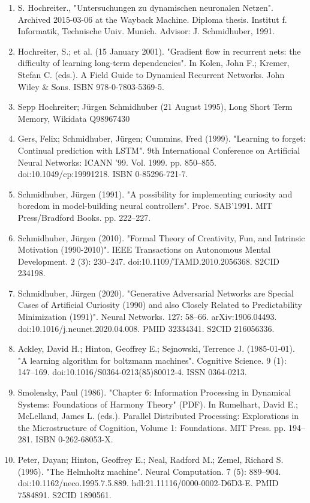 \begin{enumerate}
\item S. Hochreiter., "Untersuchungen zu dynamischen neuronalen Netzen". Archived 2015-03-06 at the Wayback Machine. Diploma thesis. Institut f. Informatik, Technische Univ. Munich. Advisor: J. Schmidhuber, 1991.
\item Hochreiter, S.; et al. (15 January 2001). "Gradient flow in recurrent nets: the difficulty of learning long-term dependencies". In Kolen, John F.; Kremer, Stefan C. (eds.). A Field Guide to Dynamical Recurrent Networks. John Wiley & Sons. ISBN 978-0-7803-5369-5.
\item Sepp Hochreiter; Jürgen Schmidhuber (21 August 1995), Long Short Term Memory, Wikidata Q98967430
\item Gers, Felix; Schmidhuber, Jürgen; Cummins, Fred (1999). "Learning to forget: Continual prediction with LSTM". 9th International Conference on Artificial Neural Networks: ICANN '99. Vol. 1999. pp. 850–855. doi:10.1049/cp:19991218. ISBN 0-85296-721-7.
\item Schmidhuber, Jürgen (1991). "A possibility for implementing curiosity and boredom in model-building neural controllers". Proc. SAB'1991. MIT Press/Bradford Books. pp. 222–227.
\item Schmidhuber, Jürgen (2010). "Formal Theory of Creativity, Fun, and Intrinsic Motivation (1990-2010)". IEEE Transactions on Autonomous Mental Development. 2 (3): 230–247. doi:10.1109/TAMD.2010.2056368. S2CID 234198.
\item Schmidhuber, Jürgen (2020). "Generative Adversarial Networks are Special Cases of Artificial Curiosity (1990) and also Closely Related to Predictability Minimization (1991)". Neural Networks. 127: 58–66. arXiv:1906.04493. doi:10.1016/j.neunet.2020.04.008. PMID 32334341. S2CID 216056336.
\item Ackley, David H.; Hinton, Geoffrey E.; Sejnowski, Terrence J. (1985-01-01). "A learning algorithm for boltzmann machines". Cognitive Science. 9 (1): 147–169. doi:10.1016/S0364-0213(85)80012-4. ISSN 0364-0213.
\item Smolensky, Paul (1986). "Chapter 6: Information Processing in Dynamical Systems: Foundations of Harmony Theory" (PDF). In Rumelhart, David E.; McLelland, James L. (eds.). Parallel Distributed Processing: Explorations in the Microstructure of Cognition, Volume 1: Foundations. MIT Press. pp. 194–281. ISBN 0-262-68053-X.
\item Peter, Dayan; Hinton, Geoffrey E.; Neal, Radford M.; Zemel, Richard S. (1995). "The Helmholtz machine". Neural Computation. 7 (5): 889–904. doi:10.1162/neco.1995.7.5.889. hdl:21.11116/0000-0002-D6D3-E. PMID 7584891. S2CID 1890561.

\end{enumerate}
